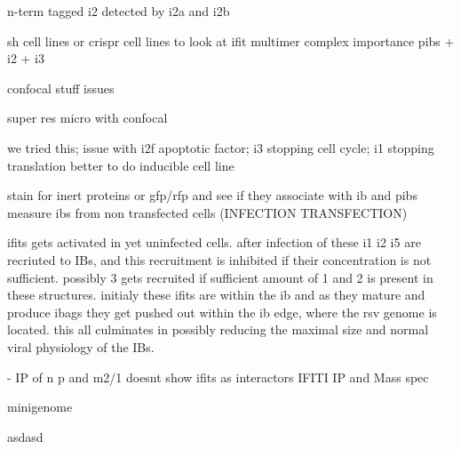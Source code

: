 

n-term tagged i2 detected by i2a and i2b

sh cell lines or crispr cell lines to look at ifit multimer complex importance
pibs + i2 + i3

confocal stuff issues

super res micro with confocal

we tried this; issue with i2f apoptotic factor; i3 stopping cell cycle; i1 stopping translation
better to do inducible cell line

stain for inert proteins or gfp/rfp and see if they associate with ib and pibs
measure ibs from non transfected cells (INFECTION TRANSFECTION)

ifits gets activated in yet uninfected cells. after infection of these i1 i2 i5 are recriuted to IBs, and this recruitment is inhibited if their concentration is not sufficient. possibly 3 gets recruited if sufficient amount of 1 and 2 is present in these structures. initialy these ifits are within the ib and as they mature and produce ibags they get pushed out within the ib edge, where the rsv genome is located. this all culminates in possibly reducing the maximal size and normal viral physiology of the IBs.

\cite{Oliveira2013HumanCells} - IP of n p and m2/1 doesnt show ifits as interactors
IFITI IP and Mass spec

minigenome \cite{Teng2016UseTranscription}


asdasd


